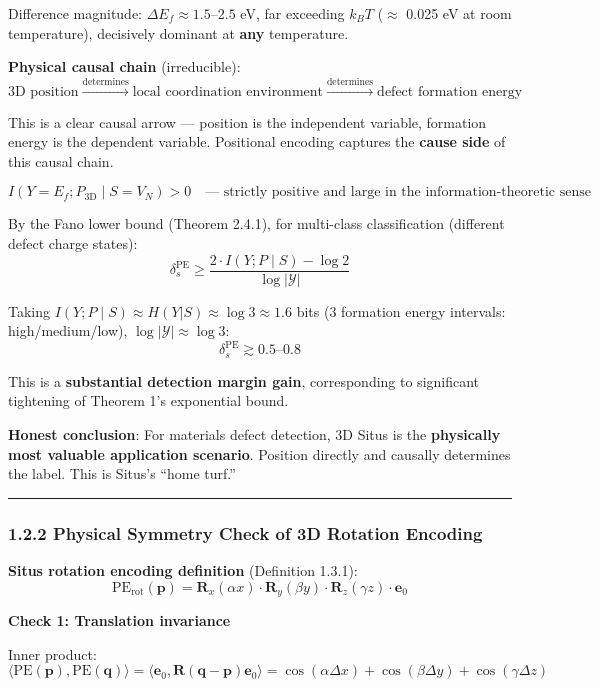 \documentclass[
  12pt,
]{article}
\begin{document}
Difference magnitude: $\Delta E_f \approx 1.5$--$2.5$ eV, far exceeding $k_B T$ ($\approx$ 0.025 eV at room temperature), decisively dominant at \textbf{any} temperature.

\textbf{Physical causal chain} (irreducible):
\[\text{3D position} \xrightarrow{\text{determines}} \text{local coordination environment} \xrightarrow{\text{determines}} \text{defect formation energy}\]

This is a clear causal arrow --- position is the independent variable, formation energy is the dependent variable. Positional encoding captures the \textbf{cause side} of this causal chain.

\[I(Y = E_f; P_{\text{3D}} \mid S = V_N) > 0 \quad \text{--- strictly positive and large in the information-theoretic sense}\]

By the Fano lower bound (Theorem 2.4.1), for multi-class classification (different defect charge states):
\[\delta_s^{\text{PE}} \geq \frac{2 \cdot I(Y; P \mid S) - \log 2}{\log |\mathcal{Y}|}\]

Taking $I(Y; P \mid S) \approx H(Y|S) \approx \log 3 \approx 1.6$ bits (3 formation energy intervals: high/medium/low), $\log |\mathcal{Y}| \approx \log 3$:
\[\delta_s^{\text{PE}} \gtrsim 0.5 \text{--}0.8\]

This is a \textbf{substantial detection margin gain}, corresponding to significant tightening of Theorem 1's exponential bound.

\textbf{Honest conclusion}: For materials defect detection, 3D Situs is the \textbf{physically most valuable application scenario}. Position directly and causally determines the label. This is Situs's ``home turf.''

\begin{center}\rule{0.5\linewidth}{0.5pt}\end{center}

\subsubsection{1.2.2 Physical Symmetry Check of 3D Rotation Encoding}\label{3d-rotation-symmetry-check}

\textbf{Situs rotation encoding definition} (Definition 1.3.1):
\[\text{PE}_{\text{rot}}(\mathbf{p}) = \mathbf{R}_x(\alpha x) \cdot \mathbf{R}_y(\beta y) \cdot \mathbf{R}_z(\gamma z) \cdot \mathbf{e}_0\]

\textbf{Check 1: Translation invariance} \checkmark

Inner product:
\[\langle \text{PE}(\mathbf{p}), \text{PE}(\mathbf{q}) \rangle = \langle \mathbf{e}_0, \mathbf{R}(\mathbf{q} - \mathbf{p}) \mathbf{e}_0 \rangle = \cos(\alpha\Delta x) + \cos(\beta\Delta y) + \cos(\gamma\Delta z)\]
\end{document}
